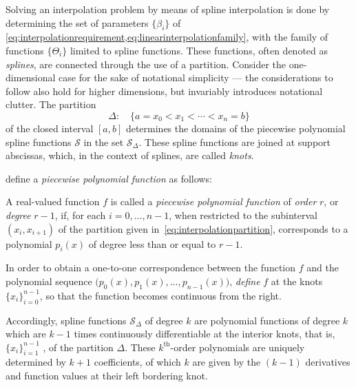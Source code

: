 Solving an interpolation problem by means of spline interpolation is done
by determining the set of parameters $\{\beta_{i}\}$ of
\cref{eq:interpolationrequirement,eq:linearinterpolationfamily}, with the
family of functions $\{\Theta_{i}\}$ limited to spline functions. These
functions, often denoted as \emph{splines}, are connected through the use
of a partition. Consider the one-dimensional case for the sake of notational
simplicity --- the considerations to follow also hold for higher dimensions,
but invariably introduces notational clutter. The partition
\begin{equation}
    \label{eq:interpolationpartition}
    \Delta : \quad \{a = x_{0} < x_{1} < \cdots < x_{n} = b\}
\end{equation}
of the closed interval $[a,b]$ determines the domains of the piecewise
polynomial spline functions $\mathcal{S}$ in the set $\mathcal{S}_{\Delta}$.
These spline functions are joined at support abscissas, which, in the context
of splines, are called \emph{knots}.

\textcite[p.107]{stoer2002introduction} define a
\emph{piecewise polynomial function} as follows:
\begin{defn}
    \label{def:piecewise_polynomial}
    A real-valued function $f$ is called a \emph{piecewise polynomial function}
    of \emph{order} $r$, or \emph{degree} $r-1$, if, for each $i=0,\ldots,n-1$,
    when restricted to the subinterval $(x_{i},x_{i+1})$ of the partition given
    in~\cref{eq:interpolationpartition}, corresponds to a polynomial
    $p_{i}(x)$ of degree less than or equal to $r-1$.

    \vspace{-0.8\baselineskip}
    In order to obtain a one-to-one correspondence between the function $f$ and
    the polynomial sequence $\big(p_{0}(x),p_{1}(x),\ldots,p_{n-1}(x)\big)$,
    \emph{define} $f$ at the knots $\{x_{i}\}_{i=0}^{n-1}$, so that the
    function becomes continuous from the right.
\end{defn}

Accordingly, spline functions $\mathcal{S}_{\Delta}$ of degree $k$ are
polynomial functions of degree $k$ which are $k-1$ times continuously
differentiable at the interior knots, that is, $\{x_{i}\}_{i=1}^{n-1}$ , of the
partition $\Delta$. These $k^{\text{th}}$-order polynomials are uniquely
determined by $k+1$ coefficients, of which $k$ are given by the $(k-1)$
derivatives and function values at their left bordering knot.

